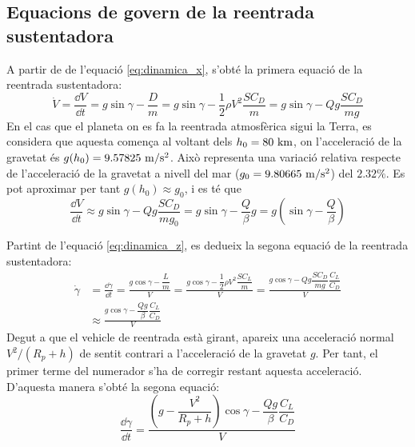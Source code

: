 \subsection{Equacions de govern de la reentrada sustentadora}

A partir de de l'equació \eqref{eq:dinamica_x}, s'obté la primera equació de la reentrada sustentadora:
\begin{equation*}
    \dot{V} = \frac{\dd V}{\dd t} = g \sin{\gamma} - \frac{D}{m} = g \sin{\gamma} - \frac{1}{2} \rho V^2 \frac{S C_D}{m} = 
    g \sin{\gamma} - Q g \frac{S C_D}{m g}
\end{equation*}
En el cas que el planeta on es fa la reentrada atmosfèrica sigui la Terra, es considera que aquesta comença al voltant dels $h_0 = 80 \ \kilo\meter$, on l'acceleració de la gravetat és $g(h_0) = 9.57825 \ \meter / \second^2$. Això representa una variació relativa respecte de l'acceleració de la gravetat a nivell del mar ($g_0 = 9.80665 \ \meter / \second^2$) del $2.32\%$. Es pot aproximar per tant $g \left( h_0 \right) \approx g_0$, i es té que
\begin{equation} \label{eq:derivada_V_t_lifting}
    \frac{\dd V}{\dd t} \approx g \sin{\gamma} - Q g \frac{S C_D}{m g_0} = 
    g \sin{\gamma} - \frac{Q}{\beta} g = g \left( \sin{\gamma} - \frac{Q}{\beta} \right)
\end{equation}

Partint de l'equació \eqref{eq:dinamica_z}, es dedueix la segona equació de la reentrada sustentadora:
\begin{align*}
    \dot{\gamma} &= \frac{\dd \gamma}{\dd t} = \frac{g \cos{\gamma} - \dfrac{L}{m}}{V} = 
    \frac{g \cos{\gamma} - \dfrac{1}{2} \rho V^2 \dfrac{S C_L}{m}}{V} = 
    \frac{g \cos{\gamma} - Q g \dfrac{S C_D}{m g} \dfrac{C_L}{C_D}}{V} \\
    &\approx \frac{g \cos{\gamma} - \dfrac{Q g}{\beta} \dfrac{C_L}{C_D}}{V} 
\end{align*}
Degut a que el vehicle de reentrada està girant, apareix una acceleració normal $V^2/ \left( R_p + h \right)$ de sentit contrari a l'acceleració de la gravetat $g$. Per tant, el primer terme del numerador s'ha de corregir restant aquesta acceleració. D'aquesta manera s'obté la segona equació:
\begin{equation} \label{eq:derivada_gamma_t_lifting}
    \frac{\dd \gamma}{\dd t} = \frac{\left( g - \dfrac{V^2}{R_p + h} \right) \cos{\gamma} - \dfrac{Q g}{\beta} \dfrac{C_L}{C_D}}{V}
\end{equation}

